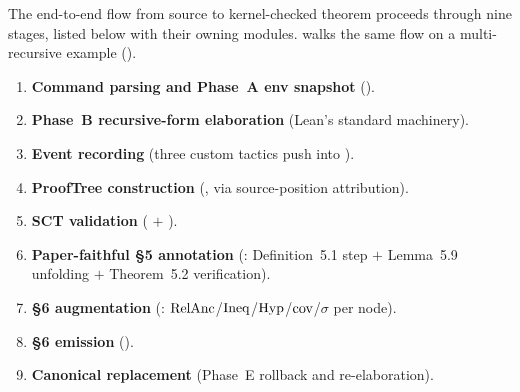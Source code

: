 The end-to-end flow from  source to kernel-checked
theorem proceeds through nine stages, listed below with their owning
modules.  walks the same flow on a
multi-recursive example ().

\begin{enumerate}
  \item \textbf{Command parsing and Phase~A env snapshot}
    ().
  \item \textbf{Phase~B recursive-form elaboration} (Lean's standard
     machinery).
  \item \textbf{Event recording} (three custom tactics push into
    ).
  \item \textbf{ProofTree construction} (,
    via source-position attribution).
  \item \textbf{SCT validation} (
    \(+\) ).
  \item \textbf{Paper-faithful §5 annotation}
    (: Definition~5.1 step \(+\) Lemma~5.9
    unfolding \(+\) Theorem~5.2 verification).
  \item \textbf{§6 augmentation} (:
    \(\mathrm{RelAnc}\)/\(\mathrm{Ineq}\)/\(\mathrm{Hyp}\)/\(\mathrm{cov}\)/\(\sigma\) per node).
  \item \textbf{§6 emission} ().
  \item \textbf{Canonical replacement} (Phase~E rollback and re-elaboration).
\end{enumerate}
